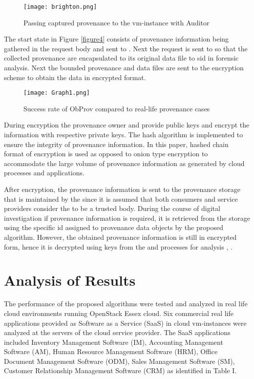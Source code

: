 \documentclass[conference]{IEEEtran}
\begin{document}
\begin{figure*}[t!]
\centering
\texttt{[image: brighton.png]}
\caption{Passing captured provenance to the vm-instance with Auditor}
\label{figure8}
\end{figure*}




The start state in Figure \ref{figure4} consists of provenance information being gathered in the request body  and sent to . Next the request is sent to  so that the collected provenance are encapsulated to its original data file to sid in forensic analysis. Next the bounded provenance and data files are sent to the encryption scheme to obtain the data in encrypted format.

\begin{figure}[t!]
\centering
\texttt{[image: Graph1.png]}
\caption{Success rate of ObProv compared to real-life provenance cases}
\label{figure9}
\end{figure}

During encryption the provenance owner and  provide public keys and encrypt the information with respective private keys. The hash algorithm is implemented to ensure the integrity of provenance information. In this paper, hashed chain format of encryption is used as opposed to onion type encryption to accommodate the large volume of provenance information as generated by cloud processes and applications.

After encryption, the provenance information is sent to the provenance storage that is maintained by the  since it is assumed that both consumers and service providers consider the  to be a trusted body. During the course of digital investigation if provenance information is required, it is retrieved from the storage using the specific id assigned to provenance data objects by the proposed algorithm. However, the obtained provenance information is still in encrypted form, hence it is decrypted using keys from the  and  processes for analysis \cite{dastjerdi2012autonomous}, \cite{slipetskyy2011security}.

\section{Analysis of Results}

The performance of the proposed algorithms were tested and analyzed in real life cloud environments running OpenStack Essex cloud. Six commercial real life applications provided as Software as a Service (SaaS) in cloud vm-instances were analyzed at the servers of the cloud service provider. The SaaS applications included Inventory Management Software (IM), Accounting Management Software (AM), Human Resource Management Software (HRM), Office Document Management Software (ODM), Sales Management Software (SM), Customer Relationship Management Software (CRM) as identified in Table I.
\end{document}
